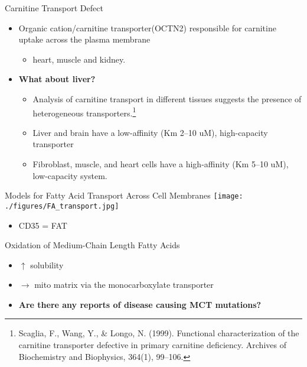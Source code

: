 \documentclass[presentation, smaller]{beamer}
\begin{document}
\begin{frame}[label={sec:orgheadline2}]{Carnitine Transport Defect}
\begin{itemize}
\item Organic cation/carnitine transporter(OCTN2) responsible for
carnitine uptake across the plasma membrane
\begin{itemize}
\item heart, muscle and kidney.
\end{itemize}

\item \textbf{What about liver?}

\begin{itemize}
\item Analysis of carnitine transport in different tissues suggests the
presence of heterogeneous transporters.\footnote{Scaglia, F., Wang, Y., \& Longo, N. (1999). Functional
characterization of the carnitine transporter defective in primary
carnitine deficiency. Archives of Biochemistry and Biophysics,
364(1), 99–106.}
\item Liver and brain have a low-affinity (Km 2–10 uM), high-capacity transporter
\item Fibroblast, muscle, and heart cells have a high-affinity (Km 5–10 uM), low-capacity system.
\end{itemize}
\end{itemize}
\end{frame}

\begin{frame}[label={sec:orgheadline3}]{Models for Fatty Acid Transport Across Cell Membranes}
\texttt{[image: ./figures/FA\_transport.jpg]}

\tiny
\begin{itemize}
\item CD35 = FAT
\end{itemize}
\end{frame}
\begin{frame}[label={sec:orgheadline4}]{Oxidation of Medium-Chain Length Fatty Acids}
\begin{itemize}
\item \(\uparrow\) solubility
\item \(\to\) mito matrix via the monocarboxylate transporter
\item \textbf{Are there any reports of disease causing MCT mutations?}
\end{itemize}
\end{frame}
\end{document}
